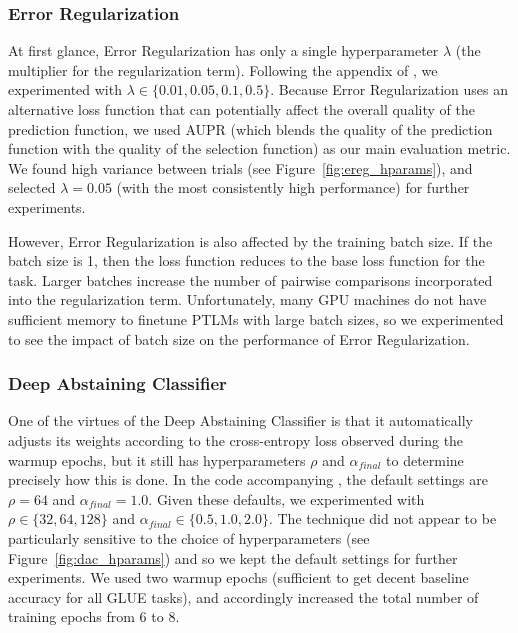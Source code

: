 \documentclass[11pt]{article}
\begin{document}
\subsubsection*{Error Regularization}

At first glance, Error Regularization has only a single hyperparameter $\lambda$ (the multiplier for the regularization term). Following the appendix of \cite{xin-etal-2021-art}, we experimented with $\lambda \in \{0.01, 0.05, 0.1, 0.5\}$. Because Error Regularization uses an alternative loss function that can potentially affect the overall quality of the prediction function, we used AUPR (which blends the quality of the prediction function with the quality of the selection function) as our main evaluation metric. We found high variance between trials (see Figure~\ref{fig:ereg_hparams}), and selected $\lambda = 0.05$ (with the most consistently high performance) for further experiments.

However, Error Regularization is also affected by the training batch size. If the batch size is 1, then the loss function reduces to the base loss function for the task. Larger batches increase the number of pairwise comparisons incorporated into the regularization term. Unfortunately, many GPU machines do not have sufficient memory to finetune PTLMs with large batch sizes, so we experimented to see the impact of batch size on the performance of Error Regularization.

\subsubsection*{Deep Abstaining Classifier}

One of the virtues of the Deep Abstaining Classifier is that it automatically adjusts its weights according to the cross-entropy loss observed during the warmup epochs, but it still has hyperparameters $\rho$ and $\alpha_{final}$ to determine precisely how this is done. In the code accompanying \cite{thulasidasan2019combating}, the default settings are $\rho=64$ and $\alpha_{final}=1.0$. Given these defaults, we experimented with $\rho \in \{32,64,128\}$ and $\alpha_{final}\in \{0.5, 1.0, 2.0\}$. The technique did not appear to be particularly sensitive to the choice of hyperparameters (see Figure~\ref{fig:dac_hparams}) and so we kept the default settings for further experiments. We used two warmup epochs (sufficient to get decent baseline accuracy for all GLUE tasks), and accordingly increased the total number of training epochs from 6 to 8.
\end{document}
